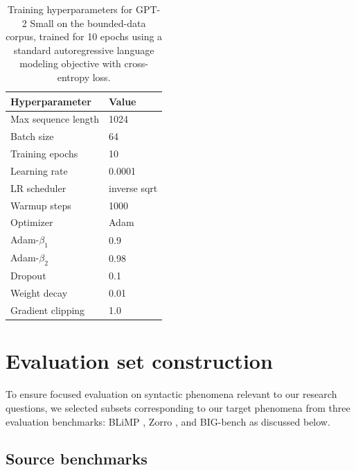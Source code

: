 \begin{table}[ht]
\centering
\small
\vspace{8pt}
\caption{Training hyperparameters for GPT-2 Small on the bounded-data corpus, trained for 10 epochs using a standard autoregressive language modeling objective with cross-entropy loss.}
\label{tab:training_hyperparameters}
\setlength{\tabcolsep}{4pt}
\renewcommand{\arraystretch}{1.1}
\begin{tabular}{@{}ll@{}}
\toprule
\textbf{Hyperparameter} & \textbf{Value} \\
\midrule
Max sequence length & 1024         \\
Batch size          & 64           \\
Training epochs     & 10           \\
Learning rate       & 0.0001       \\
LR scheduler        & inverse sqrt \\
Warmup steps        & 1000         \\
Optimizer           & Adam         \\
Adam-$\beta_1$      & 0.9          \\
Adam-$\beta_2$      & 0.98         \\
Dropout             & 0.1          \\
Weight decay        & 0.01         \\
Gradient clipping   & 1.0          \\
\bottomrule
\end{tabular}
\end{table}


\section{Evaluation set construction}
\label{app:subset_selection}

To ensure focused evaluation on syntactic phenomena relevant to our research questions, we selected subsets corresponding to our target phenomena from three evaluation benchmarks: BLiMP \citep{warstadt2020blimp}, Zorro \citep{huebner2021babyberta}, and BIG-bench \citep{srivastava2023beyond} as discussed below.

\subsection{Source benchmarks}

